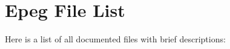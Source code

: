 \section{Epeg File List}
Here is a list of all documented files with brief descriptions:\begin{CompactList}
\item{}
\end{CompactList}
